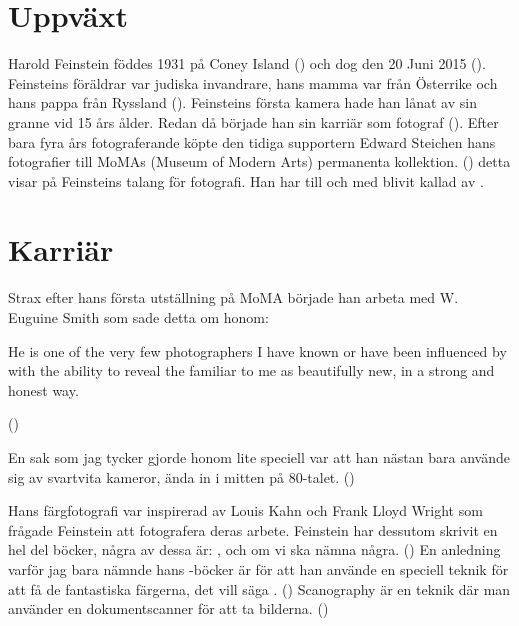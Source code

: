 \documentclass{article}
\begin{document}
\newpage

\section{Uppväxt}
Harold Feinstein föddes 1931 på Coney Island (\textcite{harsite18}) och dog den 20 Juni 2015 (\textcite{harwiki18}).
Feinsteins föräldrar var judiska invandrare, hans mamma var från Österrike och hans pappa från Ryssland (\textcite{harwiki18}).
Feinsteins första kamera hade han lånat av sin granne vid 15 års ålder.
Redan då började han sin karriär som fotograf (\textcite{harsite18}).
Efter bara fyra års fotograferande köpte den tidiga supportern Edward Steichen hans fotografier till MoMAs (Museum of Modern Arts) permanenta kollektion. (\textcite{harsite18}) detta visar på Feinsteins talang för fotografi.
Han har till och med blivit kallad  av \textcite{newtime15}.

\section{Karriär}
Strax efter hans första utställning på MoMA började han arbeta med W. Euguine Smith som sade detta om honom: 
\begin{displayquote}
	He is one of the very few photographers I have known or have been influenced by with the ability to reveal the familiar to me as beautifully new, in a strong and honest way.
\end{displayquote}

(\textcite{artandphoto})

En sak som jag tycker gjorde honom lite speciell var att han nästan bara använde sig av svartvita kameror, ända in i mitten på 80-talet. (\textcite{harsite18})

Hans färgfotografi var inspirerad av Louis Kahn och Frank Lloyd Wright som frågade Feinstein att fotografera deras arbete.
Feinstein har dessutom skrivit en hel del böcker, några av dessa är: ,  och  om vi ska nämna några. (\textcite{harsite18})
En anledning varför jag bara nämnde hans -böcker är för att han använde en speciell teknik för att få de fantastiska färgerna, det vill säga . (\textcite{artandphoto})
Scanography är en teknik där man använder en dokumentscanner för att ta bilderna. (\textcite{scanwiki})
\end{document}
